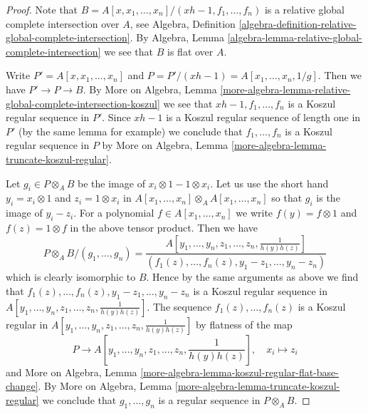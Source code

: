 \begin{proof}
Note that
$B = A[x, x_1, \ldots, x_n]/(xh - 1, f_1, \ldots, f_n)$
is a relative global complete intersection over $A$, see
Algebra, Definition
\ref{algebra-definition-relative-global-complete-intersection}.
By Algebra, Lemma \ref{algebra-lemma-relative-global-complete-intersection}
we see that $B$ is flat over $A$.

\medskip\noindent
Write $P' = A[x, x_1, \ldots, x_n]$ and
$P = P'/(xh - 1) = A[x_1, \ldots, x_n, 1/g]$.
Then we have $P' \to P \to B$.
By More on Algebra, Lemma
\ref{more-algebra-lemma-relative-global-complete-intersection-koszul}
we see that $xh - 1, f_1, \ldots, f_n$ is a Koszul regular sequence
in $P'$. Since $xh - 1$ is a Koszul regular sequence of length
one in $P'$ (by the same lemma for example) we conclude that 
$f_1, \ldots, f_n$ is a Koszul regular sequence in $P$ by
More on Algebra, Lemma \ref{more-algebra-lemma-truncate-koszul-regular}.

\medskip\noindent
Let $g_i \in P \otimes_A B$ be the image of $x_i \otimes 1 - 1 \otimes x_i$.
Let us use the short hand $y_i = x_i \otimes 1$ and $z_i = 1 \otimes x_i$
in $A[x_1, \ldots, x_n] \otimes_A A[x_1, \ldots, x_n]$
so that $g_i$ is the image of $y_i - z_i$. For a polynomial
$f \in A[x_1, \ldots, x_n]$ we write $f(y) = f \otimes 1$
and $f(z) = 1 \otimes f$ in the above tensor product.
Then we have
$$
P \otimes_A B/(g_1, \ldots, g_n) =
\frac{A[y_1, \ldots, y_n, z_1, \ldots, z_n, \frac{1}{h(y)h(z)}]}
{(f_1(z), \ldots, f_n(z), y_1 - z_1, \ldots, y_n - z_n)}
$$
which is clearly isomorphic to $B$. Hence by the same arguments
as above we find that $f_1(z), \ldots, f_n(z), y_1 - z_1, \ldots, y_n - z_n$
is a Koszul regular sequence in
$A[y_1, \ldots, y_n, z_1, \ldots, z_n, \frac{1}{h(y)h(z)}]$.
The sequence $f_1(z), \ldots, f_n(z)$ is a Koszul regular in
$A[y_1, \ldots, y_n, z_1, \ldots, z_n, \frac{1}{h(y)h(z)}]$
by flatness of the map
$$
P \longrightarrow A[y_1, \ldots, y_n, z_1, \ldots, z_n,
\textstyle{\frac{1}{h(y)h(z)}}],\quad x_i \longmapsto z_i
$$
and More on Algebra, Lemma
\ref{more-algebra-lemma-koszul-regular-flat-base-change}.
By More on Algebra, Lemma \ref{more-algebra-lemma-truncate-koszul-regular}
we conclude that $g_1, \ldots, g_n$ is a regular sequence
in $P \otimes_A B$.


\end{proof}
